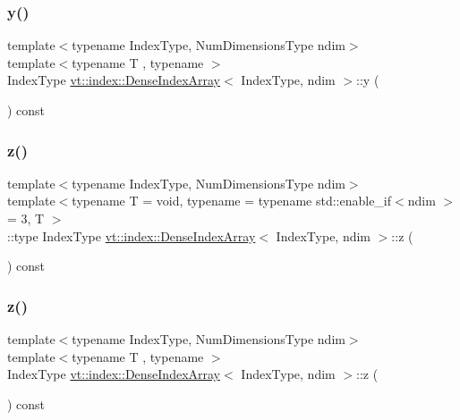 \subsubsection{\texorpdfstring{y()}{y()}\hspace{0.1cm}{\footnotesize\ttfamily [2/2]}}
{\footnotesize\ttfamily template$<$typename Index\+Type, Num\+Dimensions\+Type ndim$>$ \\
template$<$typename T , typename $>$ \\
Index\+Type \hyperlink{structvt_1_1index_1_1_dense_index_array}{vt\+::index\+::\+Dense\+Index\+Array}$<$ Index\+Type, ndim $>$\+::y (\begin{DoxyParamCaption}{ }\end{DoxyParamCaption}) const}

\mbox{\label{structvt_1_1index_1_1_dense_index_array_a8de61716f67863e9c1eca84f8c99de22}} 
\subsubsection{\texorpdfstring{z()}{z()}\hspace{0.1cm}{\footnotesize\ttfamily [1/2]}}
{\footnotesize\ttfamily template$<$typename Index\+Type, Num\+Dimensions\+Type ndim$>$ \\
template$<$typename T  = void, typename  = typename std\+::enable\+\_\+if$<$ndim $>$= 3, T $>$ \\
\+::type Index\+Type \hyperlink{structvt_1_1index_1_1_dense_index_array}{vt\+::index\+::\+Dense\+Index\+Array}$<$ Index\+Type, ndim $>$\+::z (\begin{DoxyParamCaption}{ }\end{DoxyParamCaption}) const}

\mbox{\label{structvt_1_1index_1_1_dense_index_array_a9bd7a86415c7ce861f5cf17dd5a849e0}} 
\subsubsection{\texorpdfstring{z()}{z()}\hspace{0.1cm}{\footnotesize\ttfamily [2/2]}}
{\footnotesize\ttfamily template$<$typename Index\+Type, Num\+Dimensions\+Type ndim$>$ \\
template$<$typename T , typename $>$ \\
Index\+Type \hyperlink{structvt_1_1index_1_1_dense_index_array}{vt\+::index\+::\+Dense\+Index\+Array}$<$ Index\+Type, ndim $>$\+::z (\begin{DoxyParamCaption}{ }\end{DoxyParamCaption}) const}



